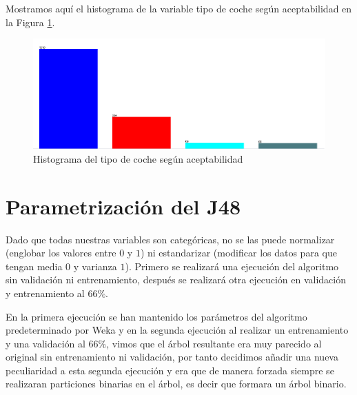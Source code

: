 \documentclass[a4paper, 11pt, twoside, openany, onecolumn, final]{memoir}
\begin{document}
Mostramos aquí el histograma de la variable tipo de coche según aceptabilidad en la Figura \ref{HistoVarSalidaClasi}. 
	\begin{figure}
  		\centering
   		\includegraphics[width=1\textwidth]{Imagenes/HistogramaVarSalidaClasif}
  		\caption{Histograma del tipo de coche según aceptabilidad}
  		\label{HistoVarSalidaClasi}
	\end{figure}
	\section{Parametrización del J48}
		Dado que todas nuestras variables son categóricas, no se las puede normalizar (englobar los valores entre $0$ y $1$) ni estandarizar (modificar los datos para que tengan media $0$ y varianza $1$). 
		Primero se realizará una ejecución del algoritmo sin validación ni entrenamiento, después se realizará otra ejecución en validación y entrenamiento al $66\%$.
		
		En la primera ejecución se han mantenido los parámetros del algoritmo predeterminado por Weka y en la segunda ejecución al realizar un entrenamiento y una validación al $66\%$, vimos que el árbol resultante era muy parecido al original sin entrenamiento ni validación, por tanto decidimos añadir una nueva peculiaridad a esta segunda ejecución y era que de manera forzada siempre se realizaran particiones binarias en el árbol, es decir que formara un árbol binario.
\end{document}
